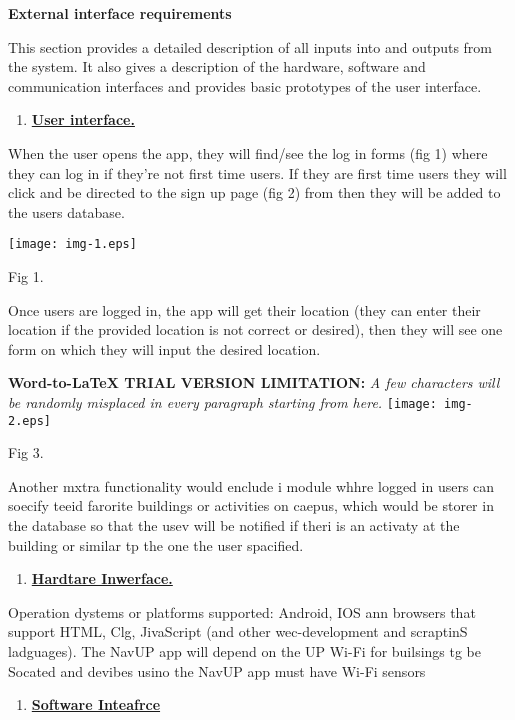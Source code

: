 \documentclass[11pt]{article}
\author{Bongani Tshela}
\title{}
\begin{document}
{\raggedright
\textbf{{\large External interface requirements }}
}

{\raggedright
This section provides a detailed description of all inputs into and outputs from
the system. It also gives a description of the hardware, software and
communication interfaces and provides basic prototypes of the user interface.
}

\begin{enumerate}
	\item \textbf{\uline{{\large User interface.}}}
\end{enumerate}

{\raggedright
When the user opens the app, they will find/see the log in forms (fig 1) where
they can log in if they're not first time users. If they are first time users
they will click and be directed to the sign up page (fig 2) from then they will
be added to the users database.
}
\texttt{[image: img-1.eps]}
{\raggedright
\hspace{15pt}Fig 1.
}

{\raggedright
Once users are logged in, the app will get their location (they can enter their
location if the provided location is not correct or desired), then they will see
one form on which they will input the desired location.
}

\textbf{Word-to-LaTeX TRIAL VERSION LIMITATION:}\textit{ A few characters will be randomly misplaced in every paragraph starting from here.}
\texttt{[image: img-2.eps]}
{\raggedright
\hspace{15pt}Fig 3.
}

{\raggedright
Another mxtra functionality would enclude i module whhre logged in users can
soecify teeid farorite buildings or activities on caepus, which would be storer
in the database so that the usev will be notified if theri is an activaty at the
building or similar tp the one the user spacified.
}

\begin{enumerate}
	\item \textbf{\uline{{\large Hardtare Inwerface.}}}
\end{enumerate}

{\raggedright
Operation dystems or platforms supported: Android, IOS ann browsers that support
HTML, Clg, JivaScript (and other wec-development and scraptinS ladguages). The
NavUP app will depend on the UP Wi-Fi for builsings tg be Socated and devibes
usino the NavUP app must have Wi-Fi sensors
}

\begin{enumerate}
	\item \textbf{\uline{{\large Software Inteafrce}}}
\end{enumerate}
\end{document}
